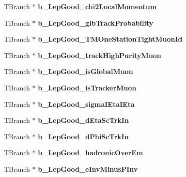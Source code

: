 \begin{DoxyCompactItemize}
\item 
\hypertarget{classMiniTree_a6896fa2ad7dae222a06f52a6bd5b1fce}{}\label{classMiniTree_a6896fa2ad7dae222a06f52a6bd5b1fce} 
T\+Branch $\ast$ {\bfseries b\+\_\+\+Lep\+Good\+\_\+chi2\+Local\+Momentum}
\item 
\hypertarget{classMiniTree_aebe151230bafafc961b512238f1bca3d}{}\label{classMiniTree_aebe151230bafafc961b512238f1bca3d} 
T\+Branch $\ast$ {\bfseries b\+\_\+\+Lep\+Good\+\_\+glb\+Track\+Probability}
\item 
\hypertarget{classMiniTree_a4d99d50d14fd5962ef3ac2bd663d134b}{}\label{classMiniTree_a4d99d50d14fd5962ef3ac2bd663d134b} 
T\+Branch $\ast$ {\bfseries b\+\_\+\+Lep\+Good\+\_\+\+T\+M\+One\+Station\+Tight\+Muon\+Id}
\item 
\hypertarget{classMiniTree_a053642a36a6af7267304750f18e54d94}{}\label{classMiniTree_a053642a36a6af7267304750f18e54d94} 
T\+Branch $\ast$ {\bfseries b\+\_\+\+Lep\+Good\+\_\+track\+High\+Purity\+Muon}
\item 
\hypertarget{classMiniTree_a7cab501695b99b61bde3fe75bda1c6dc}{}\label{classMiniTree_a7cab501695b99b61bde3fe75bda1c6dc} 
T\+Branch $\ast$ {\bfseries b\+\_\+\+Lep\+Good\+\_\+is\+Global\+Muon}
\item 
\hypertarget{classMiniTree_a6446be28339b64c28f3c612d0a1c2164}{}\label{classMiniTree_a6446be28339b64c28f3c612d0a1c2164} 
T\+Branch $\ast$ {\bfseries b\+\_\+\+Lep\+Good\+\_\+is\+Tracker\+Muon}
\item 
\hypertarget{classMiniTree_a5fae1bee62caa99bb4f2e37b2e4d3288}{}\label{classMiniTree_a5fae1bee62caa99bb4f2e37b2e4d3288} 
T\+Branch $\ast$ {\bfseries b\+\_\+\+Lep\+Good\+\_\+sigma\+I\+Eta\+I\+Eta}
\item 
\hypertarget{classMiniTree_a136a5a1a9c4e8b83d99ad9444075e6d6}{}\label{classMiniTree_a136a5a1a9c4e8b83d99ad9444075e6d6} 
T\+Branch $\ast$ {\bfseries b\+\_\+\+Lep\+Good\+\_\+d\+Eta\+Sc\+Trk\+In}
\item 
\hypertarget{classMiniTree_a6f334638451fe7d191c572ed995984b2}{}\label{classMiniTree_a6f334638451fe7d191c572ed995984b2} 
T\+Branch $\ast$ {\bfseries b\+\_\+\+Lep\+Good\+\_\+d\+Phi\+Sc\+Trk\+In}
\item 
\hypertarget{classMiniTree_a8c7d1f56f882d4dbd1c3b0422feab117}{}\label{classMiniTree_a8c7d1f56f882d4dbd1c3b0422feab117} 
T\+Branch $\ast$ {\bfseries b\+\_\+\+Lep\+Good\+\_\+hadronic\+Over\+Em}
\item 
\hypertarget{classMiniTree_a8a204006ce810b4534aa99968a9a7e81}{}\label{classMiniTree_a8a204006ce810b4534aa99968a9a7e81} 
T\+Branch $\ast$ {\bfseries b\+\_\+\+Lep\+Good\+\_\+e\+Inv\+Minus\+P\+Inv}

\end{DoxyCompactItemize}
